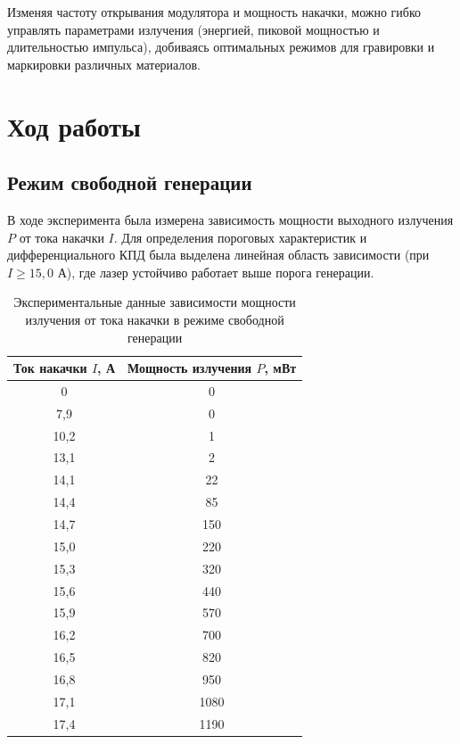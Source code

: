 \documentclass[12pt, a4paper]{article}
\begin{document}
Изменяя частоту открывания модулятора и мощность накачки, можно гибко управлять параметрами излучения (энергией, пиковой мощностью и длительностью импульса), добиваясь оптимальных режимов для гравировки и маркировки различных материалов.






\section*{Ход работы}


\subsection*{Режим свободной генерации}

В ходе эксперимента была измерена зависимость мощности выходного излучения $P$ от тока накачки $I$. Для определения пороговых характеристик и дифференциального КПД была выделена линейная область зависимости (при $I \ge 15{,}0$ А), где лазер устойчиво работает выше порога генерации. 

\begin{table}[htbp]
    \centering
    \caption{Экспериментальные данные зависимости мощности излучения от тока накачки в режиме свободной генерации}
    \label{tab:free_gen_data}
    \begin{tabular}{cc}
        \toprule
        Ток накачки $I$, А & Мощность излучения $P$, мВт \\
        \midrule
        0 & 0 \\
        7,9 & 0 \\
        10,2 & 1 \\
        13,1 & 2 \\
        14,1 & 22 \\
        14,4 & 85 \\
        14,7 & 150 \\
        15,0 & 220 \\
        15,3 & 320 \\
        15,6 & 440 \\
        15,9 & 570 \\
        16,2 & 700 \\
        16,5 & 820 \\
        16,8 & 950 \\
        17,1 & 1080 \\
        17,4 & 1190 \\
        \bottomrule
    \end{tabular}
\end{table}
\end{document}

